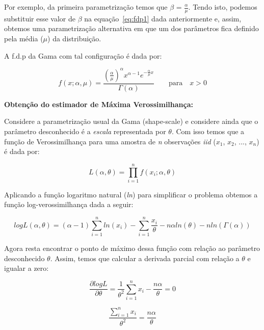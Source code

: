 Por exemplo, da primeira parametrização temos que $\beta$ = $\frac{\alpha}{\mu}$. Tendo isto, podemos substituir esse valor de $\beta$ na equação~\eqref{eq:fdp1} dada anteriormente e, assim, obtemos uma parametrização alternativa em que um dos parâmetros fica definido pela média ($\mu$) da distribuição.

A f.d.p da Gama com tal configuração é dada por:

\begin{equation}
f(x; \alpha, \mu )=\frac{(\frac{\alpha}{\mu})^{\alpha}x^{\alpha-1}e^{-\frac{\alpha}{\mu} x}}{\Gamma(\alpha)} \qquad \text{para} \quad x > 0
\end{equation}

\textbf{Obtenção do estimador de Máxima Verossimilhança:}

Considere a parametrização usual da Gama (shape-scale) e considere ainda que o parâmetro desconhecido é a \textit{escala} representada por $\theta$. Com isso temos que a função de Verossimilhança para uma amostra de \emph{n} observações \emph{iid} ($x_1$, $x_2$, ..., $x_n$) é dada por:

\begin{equation}
L(\alpha, \theta) = \prod_{i=1}^{n} f(x_i; \alpha, \theta)
\end{equation}

Aplicando a função logaritmo natural (\textit{ln}) para simplificar o problema obtemos  a função log-verossimilhança dada a seguir:

\begin{equation}
logL(\alpha, \theta) = (\alpha-1) \sum_{i=1}^{n} ln(x_i) - \sum_{i=1}^{n} \frac{x_i}{\theta} - n \alpha ln(\theta) - n ln(\Gamma(\alpha))
\end{equation}

Agora resta encontrar o ponto de máximo dessa função com relação ao parâmetro desconhecido $\theta$. Assim, temos que calcular a derivada parcial com relação a $\theta$ e igualar a zero:

\begin{equation}
\frac{\partial logL}{\partial \theta} = \frac{1}{\theta^2}\sum_{i=1}^{n}x_i - \frac{n\alpha}{\theta} = 0
\end{equation}

\begin{equation}
\frac{\sum_{i=1}^{n}x_i}{\theta^2} = \frac{n\alpha}{\theta} 
\end{equation}


